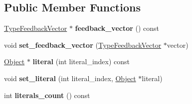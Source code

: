 \subsection*{Public Member Functions}
\begin{DoxyCompactItemize}
\item 
\hyperlink{classv8_1_1internal_1_1_type_feedback_vector}{Type\+Feedback\+Vector} $\ast$ {\bfseries feedback\+\_\+vector} () const \hypertarget{classv8_1_1internal_1_1_literals_array_a066065b783024fd4feffab41044cefc1}{}\label{classv8_1_1internal_1_1_literals_array_a066065b783024fd4feffab41044cefc1}

\item 
void {\bfseries set\+\_\+feedback\+\_\+vector} (\hyperlink{classv8_1_1internal_1_1_type_feedback_vector}{Type\+Feedback\+Vector} $\ast$vector)\hypertarget{classv8_1_1internal_1_1_literals_array_a49dbf7955ccc5613126e94e0ab7bbc68}{}\label{classv8_1_1internal_1_1_literals_array_a49dbf7955ccc5613126e94e0ab7bbc68}

\item 
\hyperlink{classv8_1_1internal_1_1_object}{Object} $\ast$ {\bfseries literal} (int literal\+\_\+index) const \hypertarget{classv8_1_1internal_1_1_literals_array_a356db8caf76ec7921ce36b4bcef98e25}{}\label{classv8_1_1internal_1_1_literals_array_a356db8caf76ec7921ce36b4bcef98e25}

\item 
void {\bfseries set\+\_\+literal} (int literal\+\_\+index, \hyperlink{classv8_1_1internal_1_1_object}{Object} $\ast$literal)\hypertarget{classv8_1_1internal_1_1_literals_array_ac4d3ef79aaa5f02d14b15d2c7a22abe6}{}\label{classv8_1_1internal_1_1_literals_array_ac4d3ef79aaa5f02d14b15d2c7a22abe6}

\item 
int {\bfseries literals\+\_\+count} () const \hypertarget{classv8_1_1internal_1_1_literals_array_ac208c3b0ef7f8792c683eb4954798850}{}\label{classv8_1_1internal_1_1_literals_array_ac208c3b0ef7f8792c683eb4954798850}

\end{DoxyCompactItemize}

